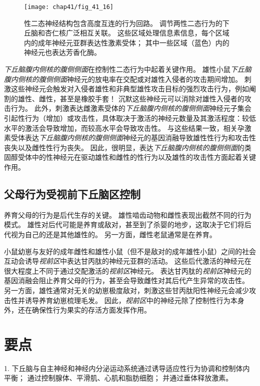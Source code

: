\begin{figure}[htbp]
	\centering
	\texttt{[image: chap41/fig\_41\_16]}
	\caption{性二态神经结构包含高度互连的行为回路。
		调节两性二态行为的下丘脑和杏仁核广泛相互关联。
		这些区域处理信息素信息，每个区域内的成年神经元亚群表达性激素受体；
		其中一些区域（蓝色）内的神经元也表达芳香化酶。}
	\label{fig:41_16}
\end{figure}


\textit{下丘脑腹内侧核的腹侧侧面}在控制性二态行为中起着关键作用。
雄性小鼠\textit{下丘脑腹内侧核的腹侧侧面}神经元的放电率在交配或对雄性入侵者的攻击期间增加。
刺激这些神经元会触发对入侵者雄性和非典型雄性攻击目标的强烈攻击行为，例如阉割的雄性、雌性，甚至是橡胶手套！
沉默这些神经元可以消除对雄性入侵者的攻击行为。
此外，刺激表达雌激素受体的\textit{下丘脑腹内侧核的腹侧侧面}神经元子集会引起性行为（增加）或攻击性，具体取决于激活的神经元数量及其激活程度：较低水平的激活会导致增加，而较高水平会导致攻击性。
与这些结果一致，相关孕激素受体表达\textit{下丘脑腹内侧核的腹侧侧面}神经元的基因消融导致雄性性行为和攻击性丧失以及雌性性行为丧失。
因此，很明显，表达\textit{下丘脑腹内侧核的腹侧侧面}的类固醇受体中的性神经元在驱动雄性和雌性的性行为以及雄性的攻击性方面起着关键作用。



\subsection{父母行为受视前下丘脑区控制}

养育父母的行为是后代生存的关键。
雄性啮齿动物和雌性表现出截然不同的行为模式。
雄性对后代可能是养育或敌对，甚至到了杀婴的地步，这取决于它们将后代视为自己的还是其他雄性的。
另一方面，雌性老鼠通常是在养育。


小鼠幼崽与友好的成年雌性和雄性小鼠（但不是敌对的成年雄性小鼠）之间的社会互动会诱导\textit{视前区}中表达甘丙肽的神经元亚群的活动。
这些后代激活的神经元在很大程度上不同于通过交配激活的\textit{视前区}神经元。
表达甘丙肽的\textit{视前区}神经元的基因消融会阻止养育父母的行为，甚至会导致雌性对其后代产生异常的攻击性。
另一方面，雄性通常对无关的幼崽极度敌对，刺激这些甘丙肽阳性神经元会减少攻击性并诱导养育幼崽梳理毛发。
因此，\textit{视前区}中的神经元除了控制性行为本身外，还在确保性行为果实的存活方面发挥作用。



\section{要点}

1. 下丘脑与自主神经和神经内分泌运动系统通过诱导适应性行为协调和控制体内平衡；
通过控制腺体、平滑肌、心肌和脂肪细胞；
并通过垂体释放激素。 


